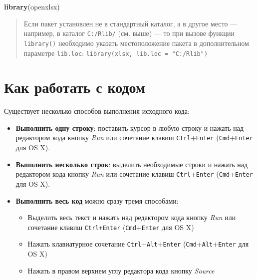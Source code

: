 \documentclass[]{book}
\newenvironment{Shaded}{\begin{snugshade}}{\end{snugshade}}
\newcommand{\KeywordTok}[1]{\textcolor[rgb]{0.13,0.29,0.53}{\textbf{#1}}}
\newcommand{\NormalTok}[1]{#1}
\providecommand{\tightlist}{%
  \setlength{\itemsep}{0pt}\setlength{\parskip}{0pt}}
\begin{document}
\begin{Shaded}
\begin{Highlighting}[]
\KeywordTok{library}\NormalTok{(openxlsx)}
\end{Highlighting}
\end{Shaded}

\begin{quote}
Если пакет установлен не в стандартный каталог, а в другое место ---
например, в каталог \texttt{С:/Rlib/} (см. выше) --- то при вызове
функции \texttt{library()} необходимо указать местоположение пакета в
дополнительном параметре \texttt{lib.loc}:
\texttt{library(xlsx,\ lib.loc\ =\ "C:/Rlib")}
\end{quote}

\section*{Как работать с кодом}\label{---}

Существует несколько способов выполнения исходного кода:

\begin{itemize}
\tightlist
\item
  \textbf{Выполнить одну строку}: поставить курсор в любую строку и
  нажать над редактором кода кнопку \emph{Run} или сочетание клавиш
  \texttt{Ctrl}+\texttt{Enter} (\texttt{Cmd}+\texttt{Enter} для OS X).
\item
  \textbf{Выполнить несколько строк}: выделить необходимые строки и
  нажать над редактором кода кнопку \emph{Run} или сочетание клавиш
  \texttt{Ctrl}+\texttt{Enter} (\texttt{Cmd}+\texttt{Enter} для OS X).
\item
  \textbf{Выполнить весь код} можно сразу тремя способами:

  \begin{itemize}
  \tightlist
  \item
    Выделить весь текст и нажать над редактором кода кнопку \emph{Run}
    или сочетание клавиш \texttt{Ctrl+Enter}
    (\texttt{Cmd}+\texttt{Enter} для OS X)
  \item
    Нажать клавиатурное сочетание
    \texttt{Ctrl}+\texttt{Alt}+\texttt{Enter}
    (\texttt{Cmd}+\texttt{Alt}+\texttt{Enter} для OS X)
  \item
    Нажать в правом верхнем углу редактора кода кнопку \emph{Source}
  \end{itemize}
\end{itemize}
\end{document}
